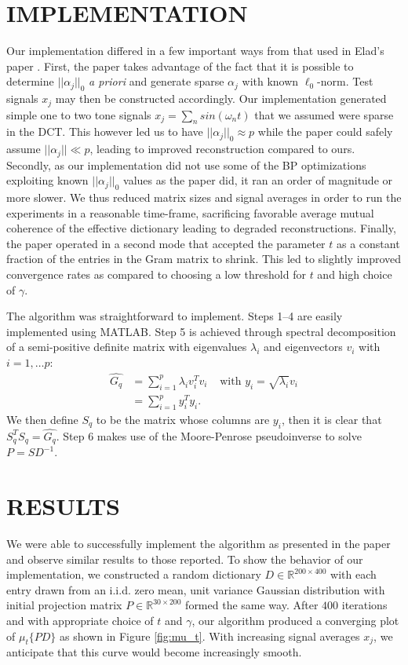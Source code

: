 \documentclass[journal]{IEEEtran}
\begin{document}
\section{IMPLEMENTATION}

Our implementation differed in a few important ways from that used in Elad's paper \cite{elad}.  First, the paper takes advantage of the fact that it is possible to determine $|| \alpha_j ||_0$ \emph{a priori} and generate sparse $\alpha_j$ with known $\ell_0$-norm.  Test signals $x_j$ may then be constructed accordingly.  Our implementation generated simple one to two tone signals $x_j = \sum_n sin(\omega_n t)$ that we assumed were sparse in the DCT.  This however led us to have $||\alpha_j||_0 \approx p$ while the paper could safely assume $ ||\alpha_j|| \ll p$, leading to improved reconstruction compared to ours.  Secondly, as our implementation did not use some of the BP optimizations exploiting known $||\alpha_j||_0$ values as the paper did, it ran an order of magnitude or more slower.  We thus reduced matrix sizes and signal averages in order to run the experiments in a reasonable time-frame, sacrificing favorable average mutual coherence of the effective dictionary leading to degraded reconstructions.  Finally, the paper operated in a second mode that accepted the parameter $t$ as a constant fraction of the entries in the Gram matrix to shrink.  This led to slightly improved convergence rates as compared to choosing a low threshold for $t$ and high choice of $\gamma$.

The algorithm was straightforward to implement.  Steps 1--4 are easily implemented using MATLAB.  Step 5 is achieved through spectral decomposition of a semi-positive definite matrix with eigenvalues $\lambda_i$ and eigenvectors $v_i$ with $i = 1, \ldots p$: $$ \begin{aligned} \hat{G_q} &= \sum_{i=1}^p \lambda_i v_i^T v_i & \mbox{ with } y_i = \sqrt{\lambda_i} v_i \\ &= \sum_{i=1}^p y_i^T y_i.  \end{aligned} $$  We then define $S_q$ to be the matrix whose columns are $y_i$, then it is clear that $S_q^T S_q = \hat{G_q}$.  Step 6 makes use of the Moore-Penrose pseudoinverse to solve $ P = S D^{-1} $.

\section{RESULTS}

We were able to successfully implement the algorithm as presented in the paper and observe similar results to those reported.  To show the behavior of our implementation, we constructed a random dictionary $D \in \mathbb{R}^{200 \times 400} $ with each entry drawn from an i.i.d. zero mean, unit variance Gaussian distribution with initial projection matrix $P \in \mathbb{R}^{30 \times 200}$ formed the same way.  After $400$ iterations and with appropriate choice of $t$ and $\gamma$, our algorithm produced a converging plot of $\mu_t\{PD\}$ as shown in Figure \ref{fig:mu_t}.  With increasing signal averages $x_j$, we anticipate that this curve would become increasingly smooth.
\end{document}
